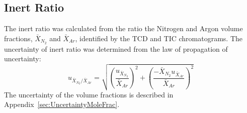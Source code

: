 \documentclass[12pt]{article}
\begin{document}
\subsection{Inert Ratio}
\label{ssec:Inert_ratio}
The inert ratio was calculated from the ratio the Nitrogen and Argon volume fractions, $\bar{X}_{N_2}$ and $\bar{X}_{Ar}$, identified by the TCD and TIC chromatograms. The uncertainty of inert ratio was determined from the law of propagation of uncertainty:
\begin{equation}
\label{eq:inert_ratio_uncertainty}
u_{\scriptscriptstyle \bar{X}_{N_2}/\bar{X}_{Ar}} = \sqrt{{\left(\frac{u_{\scriptscriptstyle \bar{X}_{N_2}}}{\bar{X}_{Ar}}\right)}^2+{\left(\frac{-\bar{X}_{N_2}u_{\scriptscriptstyle \bar{X}_{Ar}}}{\bar{X}_{Ar}}\right)}^2}
\end{equation}
The uncertainty of the volume fractions is described in Appendix~\ref{sec:UncertaintyMoleFrac}.

\pagebreak
\end{document}

